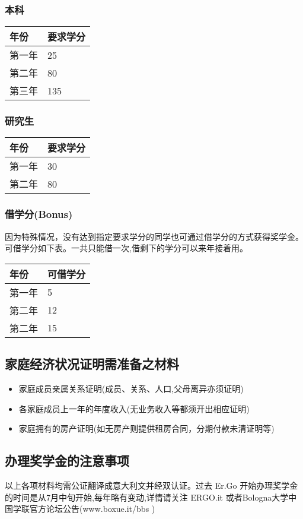 \subsubsection{本科}
\begin{tabularx}{\textwidth}{ |X|X| }
  \hline
  年份 & 要求学分\\
  \hline 
  第一年  & 25  \\
  第二年  & 80  \\
  第三年  & 135  \\
  \hline
\end{tabularx}



\subsubsection{研究生}
\begin{tabularx}{\textwidth}{ |X|X| }
  \hline
  年份 & 要求学分\\
  \hline 
  第一年  & 30  \\
  第二年  & 80  \\
  \hline
\end{tabularx}


\subsubsection{借学分(Bonus)}
因为特殊情况，没有达到指定要求学分的同学也可通过借学分的方式获得奖学金。可借学分如下表。一共只能借一次,借剩下的学分可以来年接着用。\\
\begin{tabularx}{\textwidth}{ |X|X| }
  \hline
  年份 & 可借学分\\
  \hline 
  第一年  & 5  \\
  第二年  & 12  \\
  第二年  & 15  \\
  \hline
\end{tabularx}

\subsection{家庭经济状况证明需准备之材料}
\begin{itemize}
 \item 家庭成员亲属关系证明(成员、关系、人口,父母离异亦须证明)
 \item 各家庭成员上一年的年度收入(无业务收入等都须开出相应证明) 
 \item 家庭拥有的房产证明(如无房产则提供租房合同，分期付款未清证明等)
\end{itemize} 

\subsection{办理奖学金的注意事项}
以上各项材料均需公证翻译成意大利文并经双认证。过去 Er.Go 开始办理奖学金的时间是从7月中旬开始,每年略有变动,详情请关注 ERGO.it 或者Bologna大学中国学联官方论坛公告(www.boxue.it/bbs ) 